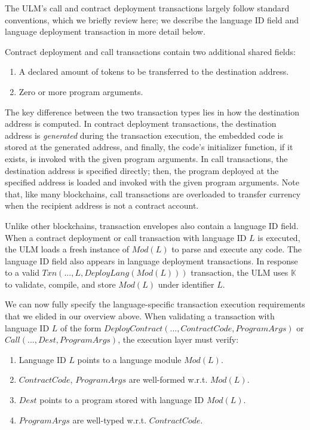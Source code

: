 \documentclass{article}
\newcommand{\ulm}{{ULM}}
\newcommand{\K}{\ensuremath{\mathbb{K}}}
\begin{document}
\noindent The \ulm{}'s call and contract deployment transactions largely follow standard conventions, which we briefly review here; we describe the language ID field and language deployment transaction in more detail below.

Contract deployment and call transactions contain two additional shared fields:

\begin{enumerate}
    \item A declared amount of tokens to be transferred to the destination address.
    \item  Zero or more program arguments.
\end{enumerate}

The key difference between the two transaction types lies in how the destination address is computed.
In contract deployment transactions, the destination address is \emph{generated} during the transaction execution, the embedded code is stored at the generated address, and finally, the code's initializer function, if it exists, is invoked with the given program arguments.
In call transactions, the destination address is specified directly; then, the program deployed at the specified address is loaded and invoked with the given program arguments.
Note that, like many blockchains, call transactions are overloaded to transfer currency when the recipient address is not a contract account.

Unlike other blockchains, transaction envelopes also contain a language ID field.
When a contract deployment or call transaction with language ID $L$ is executed, the \ulm{} loads a fresh instance of $Mod(L)$ to parse and execute any code.
The language ID field also appears in language deployment transactions. 
In response to a valid $Txn(..., L, DeployLang(Mod(L)))$ transaction, the \ulm{} uses \K{} to validate, compile, and store $Mod(L)$ under identifier $L$.

We can now fully specify the language-specific transaction execution requirements that we elided in our overview above.
When validating a transaction with language ID $L$ of the form $DeployContract(..., ContractCode, ProgramArgs)$ or $Call(..., Dest, ProgramArgs)$, the execution layer must verify:

\begin{enumerate}
    \item Language ID $L$ points to a language module $Mod(L)$.
    \item $ContractCode$, $ProgramArgs$ are well-formed w.r.t. $Mod(L)$.
    \item $Dest$ points to a program stored with language ID $Mod(L)$.
    \item $ProgramArgs$ are well-typed w.r.t. $ContractCode$.
\end{enumerate}
\end{document}
